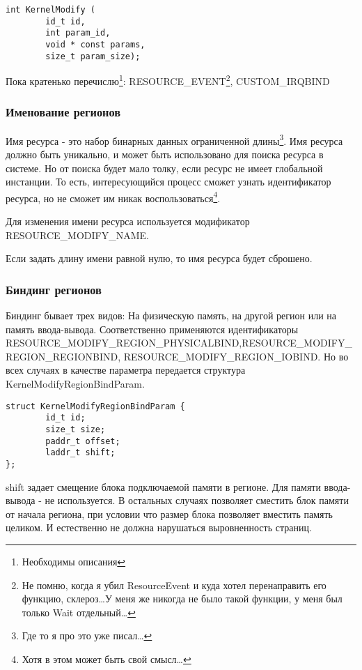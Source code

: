 \begin{verbatim}
int KernelModify (
        id_t id,
        int param_id,
        void * const params,
        size_t param_size);
\end{verbatim}\par

Пока кратенько перечислю\footnote{Необходимы описания}:
RESOURCE\_EVENT\footnote{Не помню, когда я убил ResourceEvent и куда хотел
перенаправить его функцию, склероз\ldots У меня же никогда не было такой функции,
у меня был только Wait отдельный\ldots}, CUSTOM\_IRQBIND

\subsubsection{Именование регионов}

Имя ресурса - это набор бинарных данных ограниченной длины\footnote{Где то я про
это уже писал\ldots}. Имя ресурса должно быть уникально, и может быть
использовано для поиска ресурса в системе. Но от поиска будет мало толку, если
ресурс не имеет глобальной инстанции. То есть, интересующийся процесс сможет
узнать идентификатор ресурса, но не сможет им никак воспользоваться\footnote{
Хотя в этом может быть свой смысл\ldots}.

Для изменения имени ресурса используется модификатор RESOURCE\_MODIFY\_NAME.

Если задать длину имени равной нулю, то имя ресурса будет сброшено.

\subsubsection{Биндинг регионов}

Биндинг бывает трех видов: На физическую память, на другой регион или на память
ввода-вывода. Соответственно применяются идентификаторы
RESOURCE\_MODIFY\_REGION\_PHYSICALBIND,\break RESOURCE\_MODIFY\_REGION\_REGIONBIND,
RESOURCE\_MODIFY\_REGION\_IOBIND. Но во всех случаях в качестве параметра
передается структура KernelModifyRegionBindParam.

\begin{verbatim}
struct KernelModifyRegionBindParam {
        id_t id;
        size_t size;
        paddr_t offset;
        laddr_t shift;
};
\end{verbatim}

shift задает смещение блока подключаемой памяти в регионе. Для памяти
ввода-вывода - не используется. В остальных случаях позволяет сместить блок
памяти от начала региона, при условии что размер блока позволяет вместить память
целиком. И естественно не должна нарушаться выровненность страниц.

